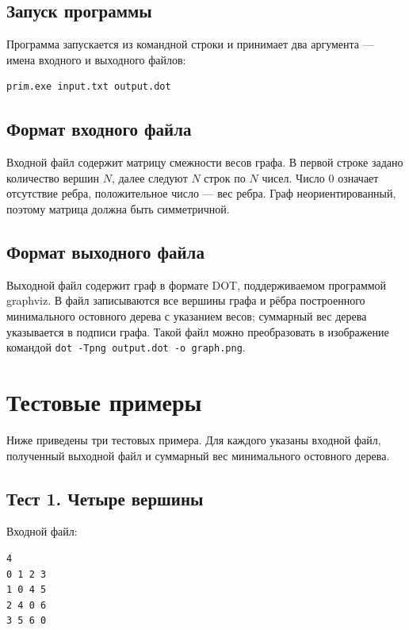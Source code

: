\documentclass[a4paper,14pt]{extarticle}
\begin{document}
\subsection{Запуск программы}

Программа запускается из командной строки и принимает два аргумента --- имена
входного и выходного файлов:

\begin{lstlisting}[language=bash]
prim.exe input.txt output.dot
\end{lstlisting}

\subsection{Формат входного файла}

Входной файл содержит матрицу смежности весов графа. В первой строке задано
количество вершин $N$, далее следуют $N$ строк по $N$ чисел. Число $0$
означает отсутствие ребра, положительное число --- вес ребра. Граф
неориентированный, поэтому матрица должна быть симметричной.

\subsection{Формат выходного файла}

Выходной файл содержит граф в формате DOT, поддерживаемом программой graphviz.
В файл записываются все вершины графа и рёбра построенного минимального
остовного дерева с указанием весов; суммарный вес дерева указывается в
подписи графа. Такой файл можно преобразовать в изображение командой
\texttt{dot -Tpng output.dot -o graph.png}.

\section{Тестовые примеры}

Ниже приведены три тестовых примера. Для каждого указаны входной файл,
полученный выходной файл и суммарный вес минимального остовного дерева.

\subsection{Тест 1. Четыре вершины}

Входной файл:
\begin{lstlisting}
4
0 1 2 3
1 0 4 5
2 4 0 6
3 5 6 0
\end{lstlisting}
\end{document}
